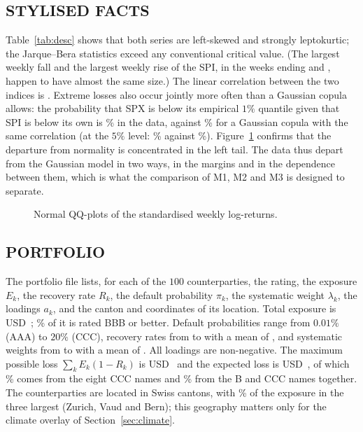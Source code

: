 \subsection{STYLISED FACTS}
\begin{table}[tb]
\caption{Weekly log-returns of SPI and SPX,  to  ($n=\val{q4.n_weeks|int}$).}
\label{tab:desc}
\centering
{}
\end{table}

Table~\ref{tab:desc} shows that both series are left-skewed and strongly leptokurtic; the Jarque--Bera statistics exceed any conventional critical value. (The largest weekly fall and the largest weekly rise of the SPI, in the weeks ending  and , happen to have almost the same size.) The linear correlation between the two indices is . Extreme losses also occur jointly more often than a Gaussian copula allows: the probability that SPX is below its empirical $1\%$ quantile given that SPI is below its own is \% in the data, against \% for a Gaussian copula with the same correlation (at the $5\%$ level: \% against \%). Figure~\ref{fig:qq} confirms that the departure from normality is concentrated in the left tail. The data thus depart from the Gaussian model in two ways, in the margins and in the dependence between them, which is what the comparison of M1, M2 and M3 is designed to separate.

\begin{figure}[tb]
\centering
{}
\caption{Normal QQ-plots of the standardised weekly log-returns.}
\label{fig:qq}
\end{figure}

\subsection{PORTFOLIO}
The portfolio file lists, for each of the $100$ counterparties, the rating, the exposure $E_k$, the recovery rate $R_k$, the default probability $\pi_k$, the systematic weight $\lambda_k$, the loadings $a_k$, and the canton and coordinates of its location. Total exposure is USD~; \% of it is rated BBB or better. Default probabilities range from $0.01\%$ (AAA) to $20\%$ (CCC), recovery rates from  to  with a mean of , and systematic weights from  to  with a mean of . All loadings are non-negative. The maximum possible loss $\sum_kE_k(1-R_k)$ is USD~ and the expected loss is USD~, of which \% comes from the eight CCC names and \% from the B and CCC names together. The counterparties are located in  Swiss cantons, with \% of the exposure in the three largest (Zurich, Vaud and Bern); this geography matters only for the climate overlay of Section~\ref{sec:climate}.

